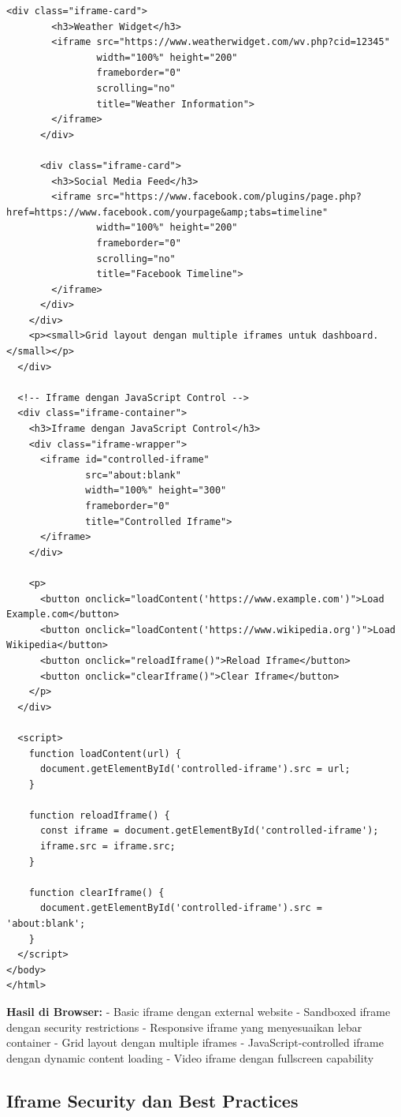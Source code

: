 \begin{lstlisting}[caption={Contoh Iframe Implementations}, basicstyle=\ttfamily\small, frame=single]
      <div class="iframe-card">
        <h3>Weather Widget</h3>
        <iframe src="https://www.weatherwidget.com/wv.php?cid=12345" 
                width="100%" height="200" 
                frameborder="0" 
                scrolling="no"
                title="Weather Information">
        </iframe>
      </div>
      
      <div class="iframe-card">
        <h3>Social Media Feed</h3>
        <iframe src="https://www.facebook.com/plugins/page.php?href=https://www.facebook.com/yourpage&amp;tabs=timeline" 
                width="100%" height="200" 
                frameborder="0" 
                scrolling="no"
                title="Facebook Timeline">
        </iframe>
      </div>
    </div>
    <p><small>Grid layout dengan multiple iframes untuk dashboard.</small></p>
  </div>
  
  <!-- Iframe dengan JavaScript Control -->
  <div class="iframe-container">
    <h3>Iframe dengan JavaScript Control</h3>
    <div class="iframe-wrapper">
      <iframe id="controlled-iframe" 
              src="about:blank" 
              width="100%" height="300" 
              frameborder="0"
              title="Controlled Iframe">
      </iframe>
    </div>
    
    <p>
      <button onclick="loadContent('https://www.example.com')">Load Example.com</button>
      <button onclick="loadContent('https://www.wikipedia.org')">Load Wikipedia</button>
      <button onclick="reloadIframe()">Reload Iframe</button>
      <button onclick="clearIframe()">Clear Iframe</button>
    </p>
  </div>
  
  <script>
    function loadContent(url) {
      document.getElementById('controlled-iframe').src = url;
    }
    
    function reloadIframe() {
      const iframe = document.getElementById('controlled-iframe');
      iframe.src = iframe.src;
    }
    
    function clearIframe() {
      document.getElementById('controlled-iframe').src = 'about:blank';
    }
  </script>
</body>
</html>
\end{lstlisting}

\textbf{Hasil di Browser:}
- Basic iframe dengan external website
- Sandboxed iframe dengan security restrictions
- Responsive iframe yang menyesuaikan lebar container
- Grid layout dengan multiple iframes
- JavaScript-controlled iframe dengan dynamic content loading
- Video iframe dengan fullscreen capability

\subsection{Iframe Security dan Best Practices}

